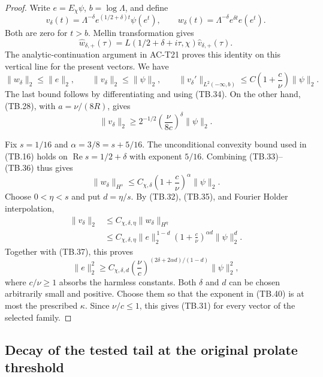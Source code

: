 \begin{proof}
Write \(e=E_\chi\psi\), \(b=\log\Lambda\), and define
\[
 v_\delta(t)=\Lambda^{-\delta}
               e^{(1/2+\delta)t}\psi(e^t),\qquad
 w_\delta(t)=\Lambda^{-\delta}e^{\delta t}e(e^t).
\]
Both are zero for \(t>b\).  Mellin transformation gives
\[
 \widehat w_{\delta,+}(\tau)
        =L(1/2+\delta+i\tau,\chi)
                             \widehat v_{\delta,+}(\tau).
 \tag{TB.35}
\]
The analytic-continuation argument in AC-T21 proves this
identity on this vertical line for the present vectors.
We have
\[
 \|w_\delta\|_2\leq\|e\|_2,\qquad
 \|v_\delta\|_2\leq\|\psi\|_2,\qquad
 \|v_\delta'\|_{L^2(-\infty,b)}
                    \leq C\left(1+\frac c\nu\right)\|\psi\|_2.
 \tag{TB.36}
\]
The last bound follows by differentiating and using (TB.34).
On the other hand, (TB.28), with \(a=\nu/(8R)\), gives
\[
 \|v_\delta\|_2\geq
          2^{-1/2}\left(\frac{\nu}{8c}\right)^\delta\|\psi\|_2.
 \tag{TB.37}
\]

Fix \(s=1/16\) and \(\alpha=3/8=s+5/16\).
The unconditional convexity bound used in (TB.16) holds
on \(\operatorname{Re}s=1/2+\delta\) with exponent \(5/16\).
Combining (TB.33)--(TB.36) thus gives
\[
 \|w_\delta\|_{H^s}
            \leq C_{\chi,\delta}
                       \left(1+\frac c\nu\right)^\alpha\|\psi\|_2.
 \tag{TB.38}
\]
Choose \(0<\eta<s\) and put \(d=\eta/s\).
By (TB.32), (TB.35), and Fourier Holder interpolation,
\[
 \begin{split}
 \|v_\delta\|_2
   &\leq C_{\chi,\delta,\eta}\|w_\delta\|_{H^\eta}\\
   &\leq C_{\chi,\delta,\eta}
        \|e\|_2^{\,1-d}
        \left(1+\frac c\nu\right)^{\alpha d}\|\psi\|_2^d .
 \end{split}
 \tag{TB.39}
\]
Together with (TB.37), this proves
\[
 \|e\|_2^2\geq
 C_{\chi,\delta,d}
 \left(\frac{\nu}{c}\right)^{(2\delta+2\alpha d)/(1-d)}
                                         \|\psi\|_2^2,
 \tag{TB.40}
\]
where \(c/\nu\geq1\) absorbs the harmless constants.
Both \(\delta\) and \(d\) can be chosen arbitrarily small
and positive.  Choose them so that the exponent in
(TB.40) is at most the prescribed \(\kappa\).
Since \(\nu/c\leq1\), this gives (TB.31) for every vector
of the selected family.
\end{proof}


\subsection{Decay of the tested tail at the original prolate threshold}


